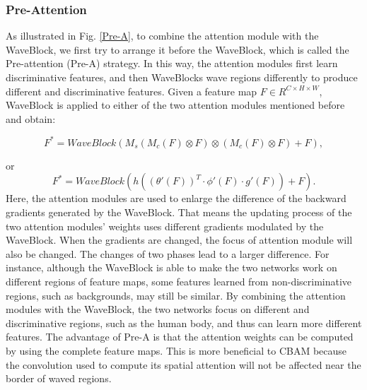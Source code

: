 \documentclass[journal]{IEEEtran}
\begin{document}
\subsubsection{Pre-Attention}
As illustrated in Fig. \ref{Pre-A}, to combine the attention module with the WaveBlock, we first try to arrange it before the WaveBlock, which is called the Pre-attention (Pre-A) strategy. In this way, the attention modules first learn discriminative features, and then WaveBlocks wave regions differently to produce different and discriminative features. Given a feature map $F \in {R^{ C \times H \times W}}$, WaveBlock is applied to either of the two attention modules mentioned before and obtain:\par

\begin{equation} 
{F^*} = WaveBlock\left( {{M_s}\left( {{M_c}\left( F \right) \otimes F} \right) \otimes \left( {{M_c}\left( F \right) \otimes F} \right) + F} \right),
\end{equation}

or
\begin{equation} 
F^* = WaveBlock\left( {h\left( {{{\left( {\theta '\left( F \right)} \right)}^T} \cdot \phi '\left( F \right) \cdot g'\left( F \right)} \right) + F} \right).
\end{equation}
Here, the attention modules are used to enlarge the difference of the backward gradients generated by the WaveBlock. That means the updating process of the two attention modules’ weights uses different gradients modulated by the WaveBlock. When the gradients are changed, the focus of attention module will also be changed. The changes of two phases lead to a larger difference. For instance, although the WaveBlock is able to make the two networks work on different regions of feature maps, some features learned from non-discriminative regions, such as backgrounds, may still be similar. By combining the attention modules with the WaveBlock, the two networks focus on different and discriminative regions, such as the human body, and thus can learn more different features. 
The advantage of Pre-A is that the attention weights can be computed by using the complete feature maps. This is more beneficial to CBAM because the convolution used to compute its spatial attention will not be affected near the border of waved regions. 
\end{document}
